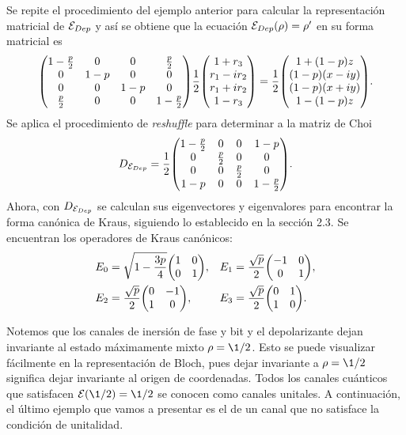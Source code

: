 Se repite el procedimiento del ejemplo anterior para calcular 
la representación matricial de $\mathcal{E}_{Dep}$ y así se obtiene
que la ecuación $\mathcal{E}_{Dep}(\rho)=\rho'$ en su forma matricial es
\begin{align}
\mqty(
1-\frac{p}{2} & 0 & 0 & \frac{p}{2} \\
0 & 1-p & 0 & 0 \\
0 & 0 & 1-p & 0 \\
\frac{p}{2} & 0 & 0 & 1-\frac{p}{2}
)
\frac{1}{2}
\mqty(
1+r_3\\r_1-ir_2\\r_1+ir_2\\1-r_3
)
=
\frac{1}{2}
\mqty(
1+\qty(1-p)z\\
\qty(1-p)\qty(x-i y)\\
\qty(1-p)\qty(x+i y)\\
1-\qty(1-p)z
).
\end{align}
Se aplica el procedimiento de \textit{reshuffle}
para determinar a la matriz de Choi
\begin{align}
D_{\E_{Dep}}=
\frac{1}{2}
\mqty(
 1-\frac{p}{2} & 0 & 0 & 1-p \\
 0 & \frac{p}{2} & 0 & 0 \\
 0 & 0 & \frac{p}{2} & 0 \\
 1-p & 0 & 0 & 1-\frac{p}{2} 
).
\label{•}
\end{align}
Ahora, con $D_{\mathcal{E}_{Dep}}$ se calculan sus 
eigenvectores y eigenvalores para encontrar la forma 
canónica de Kraus, siguiendo lo establecido en la
sección 2.3. Se encuentran los operadores de Kraus
canónicos:
\begin{align}
E_0&=
\sqrt{1-\frac{3p}{4}}
\mqty(
1 & 0\\
0 & 1
),&
E_1&=
\frac{\sqrt{p}}{2}
\mqty(
-1 & 0\\
0 & 1
),\\
E_2&=
\frac{\sqrt{p}}{2}
\mqty(
0 & -1\\
1 & 0
), &
E_3&=
\frac{\sqrt{p}}{2}
\mqty(
0 & 1\\
1 & 0
).
\end{align}

Notemos que los canales de inersión de fase y bit y el
depolarizante dejan invariante al estado máximamente mixto
$\rho=\1/2$. Esto se puede visualizar fácilmente en la representación
de Bloch, pues dejar invariante a $\rho=\1/2$ significa dejar 
invariante al origen de coordenadas. Todos los canales 
cuánticos que satisfacen $\E(\1/2)=\1/2$
se conocen como canales unitales. 
A continuación, el último ejemplo que vamos a presentar
es el de un canal que no satisface la condición de unitalidad.

